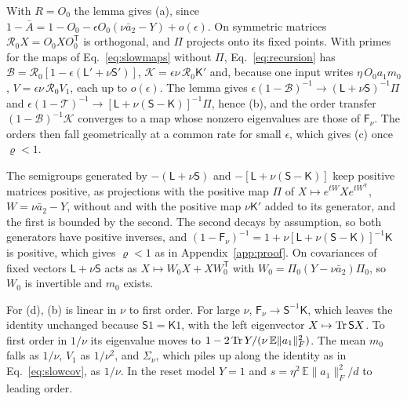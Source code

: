 With $R=O_0$ the lemma gives (a), since $1-\bar A=1-O_0-\epsilon O_0(\nu\bar a_2-Y)+o(\epsilon)$. On symmetric
matrices $\mathcal R_0X=O_0XO_0^{\mathsf T}$ is orthogonal, and $\Pi$ projects onto its fixed points. With primes for
the maps of Eq.~\eqref{eq:slowmaps} without $\Pi$, Eq.~\eqref{eq:recursion} has
$\mathcal B=\mathcal R_0[1-\epsilon(\mathsf L'+\nu\mathsf S')]$, $\mathcal K=\epsilon\nu\,\mathcal R_0\mathsf K'$
and, because one input writes $\eta\,O_0a_1m_0$, $V=\epsilon\nu\,\mathcal R_0V_1$, each up to $o(\epsilon)$. The
lemma gives $\epsilon(1-\mathcal B)^{-1}\to(\mathsf L+\nu\mathsf S)^{-1}\Pi$ and
$\epsilon(1-\mathcal T)^{-1}\to[\mathsf L+\nu(\mathsf S-\mathsf K)]^{-1}\Pi$, hence (b), and the order transfer
$(1-\mathcal B)^{-1}\mathcal K$ converges to a map whose nonzero eigenvalues are those of $\mathsf F_\nu$. The orders
then fall geometrically at a common rate for small $\epsilon$, which gives (c) once $\varrho<1$.

The semigroups generated by $-(\mathsf L+\nu\mathsf S)$ and $-[\mathsf L+\nu(\mathsf S-\mathsf K)]$ keep positive
matrices positive, as projections with the positive map $\Pi$ of $X\mapsto e^{tW}Xe^{tW^{\mathsf T}}$,
$W=\nu\bar a_2-Y$, without and with the positive map $\nu\mathsf K'$ added to its generator, and the first is bounded
by the second. The second decays by assumption, so both generators have positive inverses, and
$(1-\mathsf F_\nu)^{-1}=1+\nu[\mathsf L+\nu(\mathsf S-\mathsf K)]^{-1}\mathsf K$ is positive, which gives
$\varrho<1$ as in Appendix~\ref{app:proof}. On covariances of fixed vectors $\mathsf L+\nu\mathsf S$ acts as
$X\mapsto W_0X+XW_0^{\mathsf T}$ with $W_0=\Pi_0(Y-\nu\bar a_2)\Pi_0$, so $W_0$ is invertible and $m_0$ exists.

For (d), (b) is linear in $\nu$ to first order. For large $\nu$, $\mathsf F_\nu\to\mathsf S^{-1}\mathsf K$, which
leaves the identity unchanged because $\mathsf S1=\mathsf K1$, with the left eigenvector $X\mapsto\operatorname{Tr}\mathsf SX$. To
first order in $1/\nu$ its eigenvalue moves to $1-2\operatorname{Tr} Y/(\nu\,\mathbb E\|a_1\|_F^2)$. The mean $m_0$ falls as
$1/\nu$, $V_1$ as $1/\nu^2$, and $\Sigma_\nu$, which piles up along the identity as in Eq.~\eqref{eq:slowcov}, as
$1/\nu$. In the reset model $Y=1$ and $s=\eta^2\,\mathbb E\|a_1\|_F^2/d$ to leading order.

